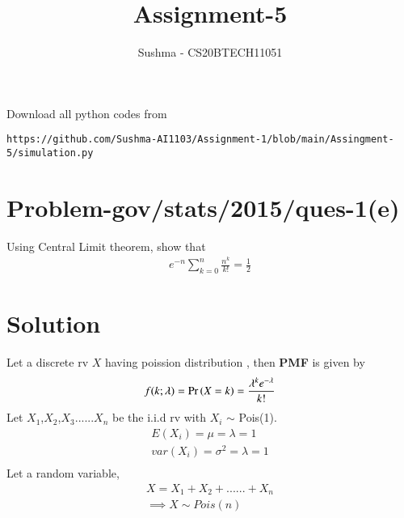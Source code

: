 \documentclass[journal,12pt,twocolumn]{IEEEtran}
\begin{document}
\let\vec\mathbf
\renewcommand{\thefigure}{\theproblem}
\def\putbox#1#2#3{\makebox[0in][l]{\makebox[#1][l]{}\raisebox{\baselineskip}[0in][0in]{\raisebox{#2}[0in][0in]{#3}}}}
     \def\rightbox#1{\makebox[0in][r]{#1}}
     \def\centbox#1{\makebox[0in]{#1}}
     \def\topbox#1{\raisebox{-\baselineskip}[0in][0in]{#1}}
     \def\midbox#1{\raisebox{-0.5\baselineskip}[0in][0in]{#1}}
\vspace{3cm}
\title{Assignment-5}
\author{Sushma - CS20BTECH11051}
\maketitle
\newpage
\bigskip
\renewcommand{\thefigure}{\theenumi}
\renewcommand{\thetable}{\theenumi}
Download all python codes from 
\begin{lstlisting}
https://github.com/Sushma-AI1103/Assignment-1/blob/main/Assingment-5/simulation.py
\end{lstlisting}

\section{Problem-gov/stats/2015/ques-1(e)}
Using Central Limit theorem, show that
\begin{align}
   e^{-n} \sum_{k=0}^{n} \frac{n^k}{k!}   = \frac{1}{2}
\end{align}
\bigskip
\section{Solution}
\begin{definition}
Let a discrete rv $X$ having poission distribution , then \textbf{PMF} is given by
\begin{align}
    f(k;\lambda) = \Pr\left(X = k\right) = \frac{\lambda^k e^{-\lambda}}{k!}
\end{align}
Let $X_1$,$X_2$,$X_3$......$X_n$ be the i.i.d rv  with $X_i$ $\sim$ Pois(1). 
\begin{align}
    E(X_i) = \mu = \lambda = 1\\
    var(X_i) = \sigma^2 = \lambda = 1\\
\end{align}
Let a random variable,
\begin{align}
    X = X_1 + X_2 + ...... + X_n\\
\implies X \sim Pois(n) 
\end{align}
\end{definition}
\end{document}
